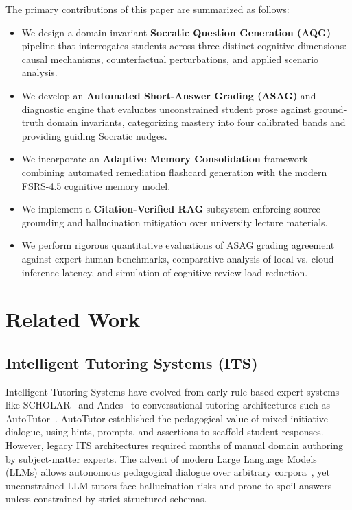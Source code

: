 \documentclass[conference]{IEEEtran}
\begin{document}
The primary contributions of this paper are summarized as follows:
\begin{itemize}
    \item We design a domain-invariant \textbf{Socratic Question Generation (AQG)} pipeline that interrogates students across three distinct cognitive dimensions: causal mechanisms, counterfactual perturbations, and applied scenario analysis.
    \item We develop an \textbf{Automated Short-Answer Grading (ASAG)} and diagnostic engine that evaluates unconstrained student prose against ground-truth domain invariants, categorizing mastery into four calibrated bands and providing guiding Socratic nudges.
    \item We incorporate an \textbf{Adaptive Memory Consolidation} framework combining automated remediation flashcard generation with the modern FSRS-4.5 cognitive memory model.
    \item We implement a \textbf{Citation-Verified RAG} subsystem enforcing source grounding and hallucination mitigation over university lecture materials.
    \item We perform rigorous quantitative evaluations of ASAG grading agreement against expert human benchmarks, comparative analysis of local vs. cloud inference latency, and simulation of cognitive review load reduction.
\end{itemize}

\section{Related Work}
\subsection{Intelligent Tutoring Systems (ITS)}
Intelligent Tutoring Systems have evolved from early rule-based expert systems like SCHOLAR~\cite{carbonell1970ai} and Andes~\cite{vanlehn2005andes} to conversational tutoring architectures such as AutoTutor~\cite{graesser1999autotutor}. AutoTutor established the pedagogical value of mixed-initiative dialogue, using hints, prompts, and assertions to scaffold student responses. However, legacy ITS architectures required months of manual domain authoring by subject-matter experts. The advent of modern Large Language Models (LLMs) allows autonomous pedagogical dialogue over arbitrary corpora~\cite{macina2023opportunities}, yet unconstrained LLM tutors face hallucination risks and prone-to-spoil answers unless constrained by strict structured schemas.
\end{document}
